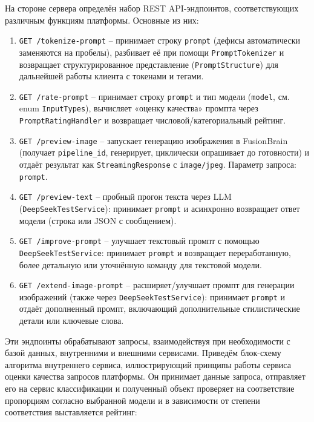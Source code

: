 На стороне сервера определён набор REST API-эндпоинтов, соответствующих различным функциям платформы. Основные из них:
\begin{enumerate}[label=\arabic*]
\item \verb|GET /tokenize-prompt| -- принимает строку \verb|prompt| (дефисы автоматически заменяются на пробелы), разбивает её при помощи \verb|PromptTokenizer| и возвращает структурированное представление (\verb|PromptStructure|) для дальнейшей работы клиента с токенами и тегами.

\item \verb|GET /rate-prompt| -- принимает строку \verb|prompt| и тип модели (\verb|model|, см. enum \verb|InputTypes|), вычисляет «оценку качества» промпта через \verb|PromptRatingHandler| и возвращает числовой/категориальный рейтинг.

\item \verb|GET /preview-image| -- запускает генерацию изображения в FusionBrain\cite{fusionbrain:docs} (получает \verb|pipeline_id|, генерирует, циклически опрашивает до готовности) и отдаёт результат как \verb|StreamingResponse| с \verb|image/jpeg|. Параметр запроса: \verb|prompt|.

\item \verb|GET /preview-text| -- пробный прогон текста через LLM (\verb|DeepSeekTestService|): принимает \verb|prompt| и асинхронно возвращает ответ модели (строка или JSON с сообщением).

\item \verb|GET /improve-prompt| -- улучшает текстовый промпт с помощью \verb|DeepSeekTestService|: принимает \verb|prompt| и возвращает переработанную, более детальную или уточнённую команду для текстовой модели.

\item \verb|GET /extend-image-prompt| -- расширяет/улучшает промпт для генерации изображений (также через \verb|DeepSeekTestService|): принимает \verb|prompt| и отдаёт дополненный промпт, включающий дополнительные стилистические детали или ключевые слова.
\end{enumerate}

Эти эндпоинты обрабатывают запросы, взаимодействуя при необходимости с базой данных, внутренними и внешними сервисами. Приведём блок-схему алгоритма внутреннего сервиса, иллюстрирующий принципы работы сервиса оценки качества запросов платформы. Он принимает данные запроса, отправляет его на сервис классификации и полученный объект проверяет на соответствие пропорциям согласно выбранной модели и в зависимости от степени соответствия выставляется рейтинг:

